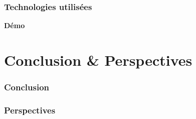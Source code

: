 \documentclass{beamer}
\begin{document}
\begin{frame}
\frametitle{Technologies utilisées}
\end{frame}
\begin{frame}
    \begin{center}
        \textbf{\Huge Démo}
    \end{center}
\end{frame}

\section{Conclusion \& Perspectives}
\begin{frame}
    \frametitle{Conclusion}
\end{frame}

\begin{frame}
    \frametitle{Perspectives}
\end{frame}
\end{document}
